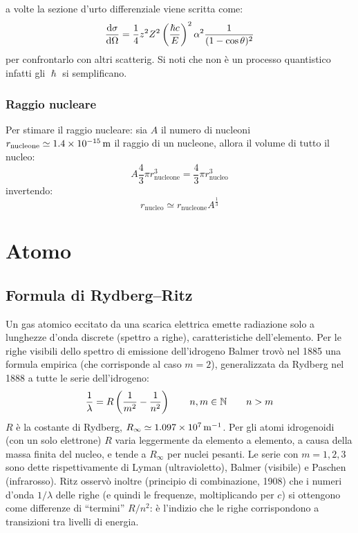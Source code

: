 a volte la sezione d'urto differenziale viene scritta come:
\begin{equation}
	\frac{\mathrm{d}\sigma}{\mathrm{d}\Omega} = \frac{1}{4}z^2 Z^2\left(\frac{\hslash c}{E}\right)^2\alpha^2\frac{1}{(1-\cos\theta)^2}
\end{equation}
per confrontarlo con altri scatterig. Si noti che non è un processo quantistico infatti gli $\hslash$ si semplificano.
\subsection{Raggio nucleare}
Per stimare il raggio nucleare: sia $A$ il numero di nucleoni $r_\text{nucleone}\simeq \SI{1.4E-15}{\meter}$ il raggio di un nucleone, allora il volume di tutto il nucleo:
\[
	A\frac{4}{3}\pi r^3_\text{nucleone}\!\!=\frac{4}{3}\pi r^3_\text{nucleo}
\]
invertendo:
\begin{equation}
	r_\text{nucleo}\simeq r_\text{nucleone}A^{\frac{1}{3}}
\end{equation}










\chapter{Atomo}
\minitoc
\section{Formula di Rydberg--Ritz}
Un gas atomico eccitato da una scarica elettrica emette radiazione solo a lunghezze d'onda discrete (spettro a righe), caratteristiche dell'elemento. Per le righe visibili dello spettro di emissione dell'idrogeno Balmer trovò nel 1885 una formula empirica (che corrisponde al caso $m=2$), generalizzata da Rydberg nel 1888 a tutte le serie dell'idrogeno:
\begin{equation}
	\frac{1}{\lambda}=R\left(\frac{1}{m^2}-\frac{1}{n^2}\right)\qquad n,m\in\mathbb{N}\qquad n>m
	\label{Ritz}
\end{equation}
$R$ è la costante di Rydberg, $R_\infty\simeq\SI{1.097E7}{\per\meter}$. Per gli atomi idrogenoidi (con un solo elettrone) $R$ varia leggermente da elemento a elemento, a causa della massa finita del nucleo, e tende a $R_\infty$ per nuclei pesanti. Le serie con $m=1,2,3$ sono dette rispettivamente di Lyman (ultravioletto), Balmer (visibile) e Paschen (infrarosso). Ritz osservò inoltre (principio di combinazione, 1908) che i numeri d'onda $1/\lambda$ delle righe (e quindi le frequenze, moltiplicando per $c$) si ottengono come differenze di ``termini'' $R/n^2$: è l'indizio che le righe corrispondono a transizioni tra livelli di energia.
